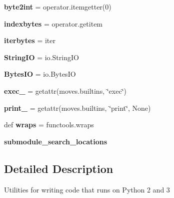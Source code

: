 \begin{DoxyCompactItemize}
{\bfseries byte2int} = operator.\+itemgetter(0)
\item 
\mbox{\label{namespacepkg__resources_1_1__vendor_1_1six_afbb24985816f4e8ecfc81f66440213b5}} 
{\bfseries indexbytes} = operator.\+getitem
\item 
\mbox{\label{namespacepkg__resources_1_1__vendor_1_1six_a18ee0b0c2aa0fe5e006269034b4f0edc}} 
{\bfseries iterbytes} = iter
\item 
\mbox{\label{namespacepkg__resources_1_1__vendor_1_1six_a10f37d064f0ae33da1b6c35e27caf77b}} 
{\bfseries String\+IO} = io.\+String\+IO
\item 
\mbox{\label{namespacepkg__resources_1_1__vendor_1_1six_ab022e24ab03b6a2914dac73296c5f5e8}} 
{\bfseries Bytes\+IO} = io.\+Bytes\+IO
\item 
\mbox{\label{namespacepkg__resources_1_1__vendor_1_1six_a5d1fffb9674d0e9bc3c52767e2c3cb73}} 
{\bfseries exec\+\_\+} = getattr(moves.\+builtins, \char`\"{}exec\char`\"{})
\item 
\mbox{\label{namespacepkg__resources_1_1__vendor_1_1six_a551d05f523be5044656e8e72ccf06ba7}} 
{\bfseries print\+\_\+} = getattr(moves.\+builtins, \char`\"{}print\char`\"{}, None)
\item 
\mbox{\label{namespacepkg__resources_1_1__vendor_1_1six_a3e37975eeae9ca1df91e27460f0fa3bd}} 
def {\bfseries wraps} = functools.\+wraps
\item 
\mbox{\label{namespacepkg__resources_1_1__vendor_1_1six_ac4cd5430ca3104bf6f12a2b3f1e22ce5}} 
{\bfseries submodule\+\_\+search\+\_\+locations}
\end{DoxyCompactItemize}


\subsection{Detailed Description}
\begin{DoxyVerb}Utilities for writing code that runs on Python 2 and 3\end{DoxyVerb}
 

